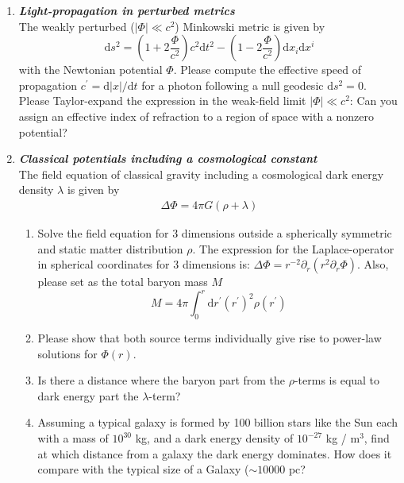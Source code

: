 \documentclass[a4paper,12pt]{article}
\newcommand{\question}[1]{\textbf{\textit{#1}}}
\newcommand{\dd}{\mathrm{d}}
\begin{document}
\begin{enumerate}
\item \question{Light-propagation in perturbed metrics}\\
The weakly perturbed ($\left|\Phi\right|\ll c^2$) Minkowski metric is given by 
\begin{equation}
\dd s^2 = \left(1+2\frac{\Phi}{c^2}\right) c^2\dd t^2 - \left(1-2\frac{\Phi}{c^2}\right)\dd x_i\dd x^i
\end{equation}
with the Newtonian potential $\Phi$. Please compute the effective speed of propagation $c^\prime = \dd\left|x\right|/\dd t$ for a photon following a null geodesic $\dd s^2=0$. Please Taylor-expand the expression in the weak-field limit $\left|\Phi\right|\ll c^2$: Can you assign an effective index of refraction to a region of space with a nonzero potential?


\item \question{Classical potentials including a cosmological constant}\\
The field equation of classical gravity including a cosmological dark
energy density $\lambda$ is given by
\begin{align}
\Delta\Phi = 4\pi G(\rho + \lambda)
\end{align}
\begin{enumerate}
\item{Solve the field equation for $3$ dimensions outside a
    spherically symmetric and static matter distribution $\rho$. The
    expression for the Laplace-operator in spherical coordinates for
    $3$ dimensions is: $\Delta\Phi=
    r^{-2}\partial_r(r^2\partial_r\Phi)$. Also, please set as the
    total baryon mass $M$
\begin{equation}
M = 4\pi\int_0^r\dd r^\prime (r^\prime)^2\rho(r^\prime)
\end{equation}
}
\item{Please show that both source terms individually give rise to power-law solutions for $\Phi(r)$.}
\item{Is there a distance where the baryon part from the $\rho$-terms
    is equal to dark energy part the $\lambda$-term?}
\item{Assuming a typical galaxy is formed by 100 billion stars like
    the Sun each with a mass of $10^{30}$ kg, and a dark energy density
    of $10^{-27}$ kg / m$^3$, find at which distance from a galaxy the
    dark energy dominates. How does it compare with the typical size
    of a Galaxy ($\sim 10000$ pc?}
\end{enumerate}



\end{enumerate}
\end{document}
